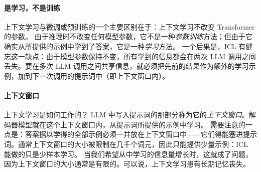 \paragraph{是学习，不是训练}
上下文学习与微调或预训练的一个主要区别在于：上下文学习不改变 Transformer 的参数。
由于推理时不改变任何模型参数，它不是一种{\em 参数训练}方法；但由于它确实从所提供的示例中学到了答案，它是一种{\em 学习}方法。
%
%
一个后果是，ICL 有健忘这一缺点：由于模型参数保持不变，所有学到的信息都会在两次 LLM 调用之间丢失。要在多次 LLM 调用之间共享信息，就必须把先前的结果作为额外的学习示例，加到下一次调用的提示词中（即上下文窗口内）。

\paragraph{上下文窗口}
上下文学习是如何工作的？
LLM 中写入提示词的那部分称为它的{\em 上下文窗口}。解码器模型就在这个上下文窗口内，从提示词所提供的示例中学习。
需要注意的一点是：答案据以学得的全部示例必须一并放在上下文窗口中——它们得能塞进提示词。通常上下文窗口的大小被限制在几千个词元，因此只能提供少量示例：ICL 能做的只是少样本学习。
当我们希望从中学习的信息量增长时，这就成了问题，因为上下文窗口的大小通常是有限的。可以说，上下文学习患有长期记忆丧失。

